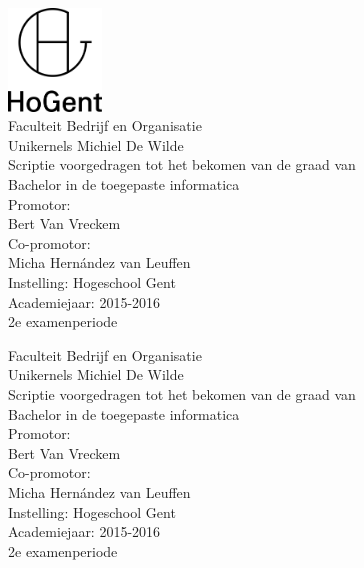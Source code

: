 \documentclass[pdftex,a4paper,12pt,twoside]{report}
\newcommand{\emptypage}{
\newpage
\thispagestyle{empty}
\mbox{}
\newpage
}
\newcommand{\student}{Michiel De Wilde}
\newcommand{\promotor}{Bert Van Vreckem}
\newcommand{\copromotor}{Micha Hernández van Leuffen}
\newcommand{\instelling}{Hogeschool Gent}
\newcommand{\titel}{Unikernels}
\newcommand{\faculteit}{Faculteit Bedrijf en Organisatie}
\newcommand{\rapporttype}{Scriptie voorgedragen tot het bekomen van de graad van\\Bachelor in de toegepaste informatica}
\newcommand{\academiejaar}{2015-2016}
\newcommand{\examenperiode}{2e examenperiode}
\begin{document}

\begin{titlepage}
  \begin{center}

    \begingroup
    \rmfamily
    \includegraphics[width=2.5cm]{img/HG-beeldmerk-woordmerk}\\[.5cm]
    \faculteit\\[3cm]
    \titel
    \vfill
    \student\\[3.5cm]
    \rapporttype\\[2cm]
    Promotor:\\
    \promotor\\
    Co-promotor:\\
    \copromotor\\[2.5cm]
    Instelling: \instelling\\[.5cm]
    Academiejaar: \academiejaar\\[.5cm]
    \examenperiode
    \endgroup

  \end{center}
  \restoregeometry
\end{titlepage}


\emptypage


\begin{titlepage}
  \begin{center}

    \begingroup
    \rmfamily
    \faculteit\\[3cm]
    \titel
    \vfill
    \student\\[3.5cm]
    \rapporttype\\[2cm]
    Promotor:\\
    \promotor\\
    Co-promotor:\\
    \copromotor\\[2.5cm]
    Instelling: \instelling\\[.5cm]
    Academiejaar: \academiejaar\\[.5cm]
    \examenperiode
    \endgroup

  \end{center}
  \restoregeometry
\end{titlepage}
\end{document}
